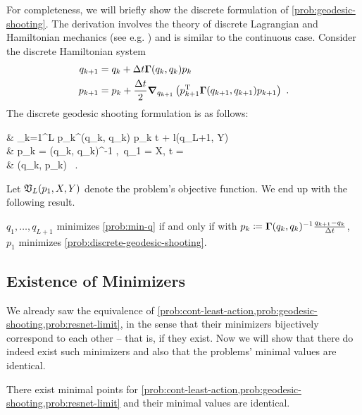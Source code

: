 For completeness, we will briefly show the discrete formulation of \cref{prob:geodesic-shooting}.
The derivation involves the theory of discrete Lagrangian and Hamiltonian mechanics (see e.g. \cite{west04}) and is similar to the continuous case.
Consider the discrete Hamiltonian system
\begin{equation}
\label{eq:discrete-hamiltonian-system}
	\begin{split}
		q_{k+1} &= q_k + \Delta t \mathbf{\Gamma}(q_k, q_k) p_k\\
		p_{k+1} &= p_k + \frac{\Delta t}{2} \grad_{q_{k+1}} \left(p_{k+1}^{\mathrm{T}} \mathbf{\Gamma}(q_{k+1}, q_{k+1}) p_{k+1}\right)\ .
	\end{split}
\end{equation}
The discrete geodesic shooting formulation is as follows:
\begin{problem}
	\label{prob:discrete-geodesic-shooting}
	\begin{cases}
		 &  \sum_{k=1}^L p_k^\T \bGamma(q_k, q_k) p_k \Delta t + l(q_{L+1}, Y)\\
		 & p_k = \bGamma(q_k, q_k)^{-1} ,\ q_1 = X, \Delta t =  \\
		& (q_k, p_k) \ .
	\end{cases}
\end{problem}
Let $\mathfrak{V}_L(p_1, X, Y)$ denote the problem's objective function.
We end up with the following result.
\begin{theorem}
	\label{theo:discrete-shooting-min-q-equivalence}
	$q_1, \dots, q_{L+1}$ minimizes \cref{prob:min-q} if and only if with $p_k \coloneqq \mathbf{\Gamma}(q_k, q_k)^{-1} \frac{q_{k+1} - q_k}{\Delta t}$, $p_1$ minimizes \cref{prob:discrete-geodesic-shooting}.
\end{theorem}

\subsection{Existence of Minimizers}

We already saw the equivalence of \cref{prob:cont-least-action,prob:geodesic-shooting,prob:resnet-limit}, in the sense that their minimizers bijectively correspond to each other -- that is, if they exist.
Now we will show that there do indeed exist such minimizers and also that the problems' minimal values are identical.
\begin{theorem}
	\label{theo:continuous-solutions-existence}
		There exist minimal points for \cref{prob:cont-least-action,prob:geodesic-shooting,prob:resnet-limit} and their minimal values are identical.
\end{theorem}

